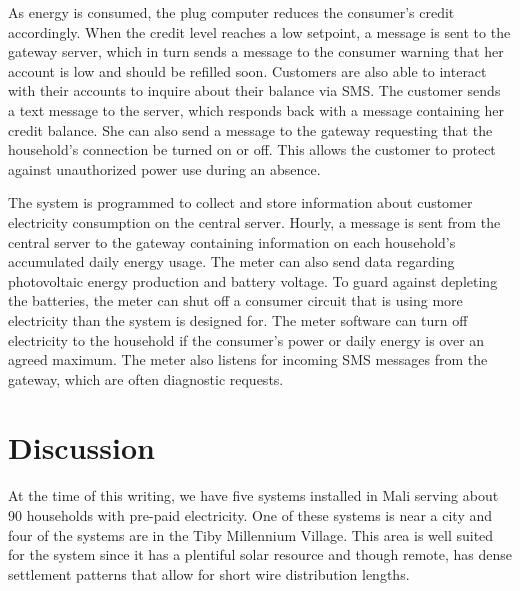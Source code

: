 \documentclass{sig-alternate}
\begin{document}
As energy is consumed, the plug computer reduces the consumer's credit accordingly.
When the credit level reaches a low setpoint, a message is sent to the
gateway server, which in turn sends a message to the consumer warning that her account is low and should be refilled soon.
Customers are also able to interact with their accounts to inquire about
their balance via SMS.
The customer sends a text message to the server, which responds back
with a message containing her credit balance.
She can also send a message to the gateway requesting that the household's
connection be turned on or off.
This allows the customer to protect against unauthorized power use
during an absence.

The system is programmed to collect and store information about customer
electricity consumption on the central server.
Hourly, a message is sent from the central server to the gateway
containing information on each household's accumulated daily energy
usage.
The meter can also send data regarding photovoltaic energy production
and battery voltage.
To guard against depleting the batteries, the meter can shut off a consumer
circuit that is using more electricity than the system is designed for.
The meter software can turn off electricity to the household if the consumer's
power or daily energy is over an agreed maximum.
The meter also listens for incoming SMS messages from the gateway,
which are often diagnostic requests.


\section{Discussion}
At the time of this writing, we have five systems installed in Mali
serving about 90 households with pre-paid electricity.
One of these systems is near a city and four of the systems are in the
Tiby Millennium Village.
This area is well suited for the system since it has
a plentiful solar resource and though remote, has dense settlement
patterns that allow for short wire distribution lengths.
\end{document}
